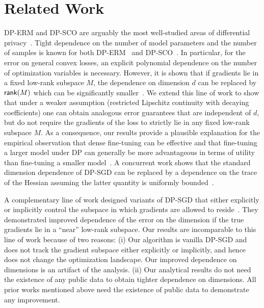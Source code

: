 \section{Related Work}
DP-ERM and DP-SCO are arguably the most well-studied areas of differential privacy~\citep{chaudhuri2011differentially,kifer2012private,bassily2014private,song2013stochastic,wang17amd,fts17,bassily2019private,mcmahan2017learning,zzmw17,WLKCJN17,FKT20,iyengar2019towards,BFGT20,song2020characterizing,ll21,afkt21,bgn21,gtu22,gll22}. Tight dependence on the number of model parameters and the number of samples is known for both DP-ERM~\citep{bassily2014private} and DP-SCO~\citep{bassily2019private}. 
In particular, for the error on general convex losses, an explicit polynomial dependence on the number of optimization variables is necessary.
However, it is shown that if gradients lie in a fixed low-rank subspace $M$, the dependence on dimension $d$ can be replaced by ${\sf rank}(M)$ which can be significantly smaller~\citep{jain2014near,song2020characterizing}. 
We extend this line of work to show that under a weaker assumption (restricted Lipschitz continuity with decaying coefficients) one can obtain analogous error guarantees that are independent of $d$, but do not require the gradients of the loss to strictly lie in any fixed low-rank subspace $M$. 
As a consequence, our results provide a plausible explanation for the empirical observation that dense fine-tuning can be effective and that fine-tuning a larger model under DP can generally be more advantageous in terms of utility than fine-tuning a smaller model~\citep{li2021large,yu2021differentially}. 
A concurrent work shows that the standard dimension dependence of DP-SGD can be replaced by a dependence on the trace of the Hessian assuming the latter quantity is uniformly bounded~\citep{ma2022dimension}.

A complementary line of work designed variants of DP-SGD that either explicitly or implicitly control the subspace in which gradients are allowed to reside~\citep{PDA-DPMD,liu2021leveraging,asi2021private,KRRT21,YZCL21}. 
They demonstrated improved dependence of the error on the dimension if the true gradients lie in a ``near'' low-rank subspace. 
Our results are incomparable to this line of work because of two reasons: (i) Our algorithm is vanilla DP-SGD and does not track the gradient subspace either explicitly or implicitly, and hence does not change the optimization landscape. 
Our improved dependence on dimensions is an artifact of the analysis. 
(ii) Our analytical results do not need the existence of any public data to obtain tighter dependence on dimensions. All prior works mentioned above need the existence of public data to demonstrate any improvement.

